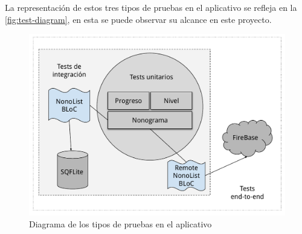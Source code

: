  La representación de estos tres tipos de pruebas en el aplicativo se refleja en la \autoref{fig:test-diagram}, en
 esta se puede observar su alcance en este proyecto.

 \begin{figure}[H]
    \centering
    \includegraphics[scale=0.5]{images/testdiagram.pdf}
    \caption{Diagrama de los tipos de pruebas en el aplicativo}
    \label{fig:test-diagram}
\end{figure}